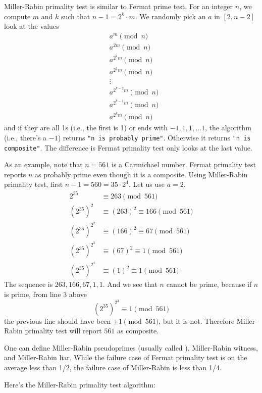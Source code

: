 Miller-Rabin primality test is similar to Fermat prime test.
For an integer $n$, we compute $m$ and $k$ such that $n - 1 = 2^k \cdot m$.
We randomly pick an $a$ in $[2, n-2]$
look at the values
\begin{align*}
  &a^m \pmod{n} \\
  &a^{2m} \pmod{n} \\
  &a^{2^2m} \pmod{n} \\
  &a^{2^3m} \pmod{n} \\
  &\vdots \\
  &a^{2^{k-2} m} \pmod{n} \\
  &a^{2^{k-1} m} \pmod{n} \\
  &a^{2^k m} \pmod{n}
\end{align*}
and if they are all 1s (i.e., the first is 1)
or ends with $-1,1,1,...1$, the algorithm (i.e., there's a $-1$)
returns \verb!"n is probably prime"!.
Otherwise it returns \verb!"n is composite"!.
The difference is Fermat primality test only looks at the last value.

\begin{eg}
As an example, note that $n = 561$ is a Carmichael number.
Fermat primality test reports $n$ as probably prime even though it is
a composite.
Using Miller-Rabin primality test, first $n - 1 = 560 = 35 \cdot 2^4$.
Let us use $a = 2$.
\begin{align*}
  2^{35}        &\equiv 263 \pmod{561} \\
  (2^{35})^2    &\equiv (263)^2 \equiv 166 \pmod{561} \\
  (2^{35})^{2^2} &\equiv (166)^2 \equiv 67 \pmod{561} \\
  (2^{35})^{2^3} &\equiv (67)^2 \equiv 1 \pmod{561} \\
  (2^{35})^{2^4} &\equiv (1)^2 \equiv 1 \pmod{561}
\end{align*}
The sequence is $263, 166, 67, 1, 1$.
And we see that $n$ cannot be prime, because if $n$ is prime, from line 3 above
\[
(2^{35})^{2^3} \equiv 1 \pmod{561}
\]
the previous line should have been $\pm 1 \pmod{561}$, but it is not.
Therefore Miller-Rabin primality test will report $561$ as composite.
\end{eg}

One can define
Miller-Rabin pseudoprimes (usually called ),
Miller-Rabin witness,
and
Miller-Rabin liar.
While the failure case of Fermat primality test is on the average
less than 1/2, the
failure case of Miller-Rabin is less than 1/4.

Here's the Miller-Rabin primality test algorithm:


